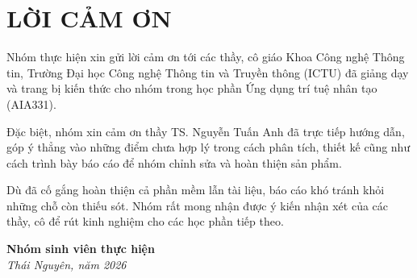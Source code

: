 \chapter*{LỜI CẢM ƠN}

Nhóm thực hiện xin gửi lời cảm ơn tới các thầy, cô giáo Khoa Công nghệ Thông tin, Trường Đại học Công nghệ Thông tin và Truyền thông (ICTU) đã giảng dạy và trang bị kiến thức cho nhóm trong học phần Ứng dụng trí tuệ nhân tạo (AIA331).

Đặc biệt, nhóm xin cảm ơn thầy TS. Nguyễn Tuấn Anh đã trực tiếp hướng dẫn, góp ý thẳng vào những điểm chưa hợp lý trong cách phân tích, thiết kế cũng như cách trình bày báo cáo để nhóm chỉnh sửa và hoàn thiện sản phẩm.

Dù đã cố gắng hoàn thiện cả phần mềm lẫn tài liệu, báo cáo khó tránh khỏi những chỗ còn thiếu sót. Nhóm rất mong nhận được ý kiến nhận xét của các thầy, cô để rút kinh nghiệm cho các học phần tiếp theo.

\vspace{1.5cm}
\begin{flushright}
 \textbf{Nhóm sinh viên thực hiện}\\
 \textit{Thái Nguyên, năm 2026}
\end{flushright}
